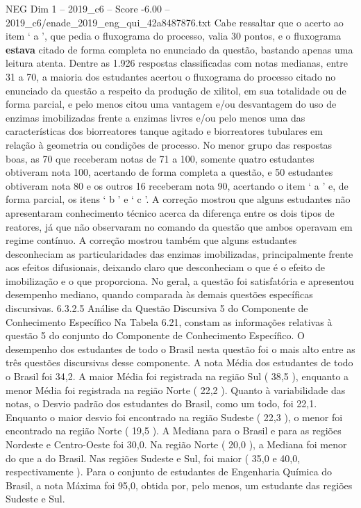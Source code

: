 \begin{textsample}{NEG Dim 1 – 2019\_c6 – Score -6.00 – 2019\_c6/enade\_2019\_eng\_qui\_42a8487876.txt}
Cabe ressaltar que o acerto ao item ‘ a ’, que pedia o fluxograma do processo, valia 30 pontos, e o fluxograma \textbf{estava} citado de forma completa no enunciado da questão, bastando apenas uma leitura atenta.
Dentre as 1.926 respostas classificadas com notas medianas, entre 31 a 70, a maioria dos estudantes acertou o fluxograma do processo citado no enunciado da questão a respeito da produção de xilitol, em sua totalidade ou de forma parcial, e pelo menos citou uma vantagem e/ou desvantagem do uso de enzimas imobilizadas frente a enzimas livres e/ou pelo menos uma das características dos biorreatores tanque agitado e biorreatores tubulares em relação à geometria ou condições de processo.
No menor grupo das respostas boas, as 70 que receberam notas de 71 a 100, somente quatro estudantes obtiveram nota 100, acertando de forma completa a questão, e 50 estudantes obtiveram nota 80 e os outros 16 receberam nota 90, acertando o item ‘ a ’ e, de forma parcial, os itens ‘ b ’ e ‘ c ’.
A correção mostrou que alguns estudantes não apresentaram conhecimento técnico acerca da diferença entre os dois tipos de reatores, já que não observaram no comando da questão que ambos operavam em regime contínuo.
A correção mostrou também que alguns estudantes desconheciam as particularidades das enzimas imobilizadas, principalmente frente aos efeitos difusionais, deixando claro que desconheciam o que é o efeito de imobilização e o que proporciona.
No geral, a questão foi satisfatória e apresentou desempenho mediano, quando comparada às demais questões específicas discursivas. 6.3.2.5 Análise da Questão Discursiva 5 do Componente de Conhecimento Específico Na Tabela 6.21, constam as informações relativas à questão 5 do conjunto do Componente de Conhecimento Específico.
O desempenho dos estudantes de todo o Brasil nesta questão foi o mais alto entre as três questões discursivas desse componente.
A nota Média dos estudantes de todo o Brasil foi 34,2.
A maior Média foi registrada na região Sul ( 38,5 ), enquanto a menor Média foi registrada na região Norte ( 22,2 ).
Quanto à variabilidade das notas, o Desvio padrão dos estudantes do Brasil, como um todo, foi 22,1.
Enquanto o maior desvio foi encontrado na região Sudeste ( 22,3 ), o menor foi encontrado na região Norte ( 19,5 ).
A Mediana para o Brasil e para as regiões Nordeste e Centro-Oeste foi 30,0.
Na região Norte ( 20,0 ), a Mediana foi menor do que a do Brasil.
Nas regiões Sudeste e Sul, foi maior ( 35,0 e 40,0, respectivamente ).
Para o conjunto de estudantes de Engenharia Química do Brasil, a nota Máxima foi 95,0, obtida por, pelo menos, um estudante das regiões Sudeste e Sul.

\end{textsample}
